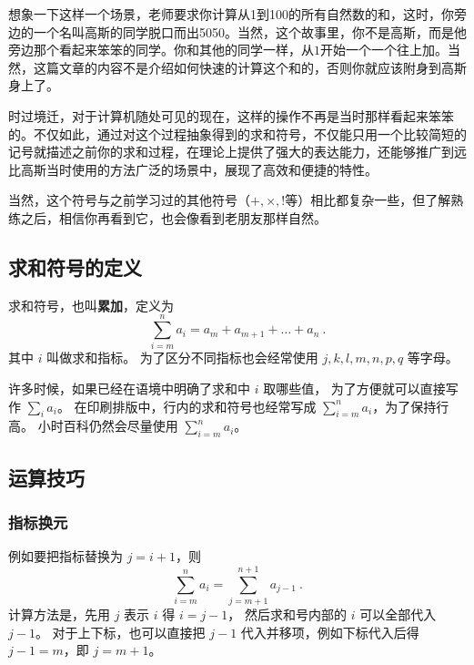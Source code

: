 
\begin{issues}
\issueDraft
\end{issues}


想象一下这样一个场景，老师要求你计算从1到100的所有自然数的和，这时，你旁边的一个名叫高斯的同学脱口而出5050。当然，这个故事里，你不是高斯，而是他旁边那个看起来笨笨的同学。你和其他的同学一样，从$1$开始一个一个往上加。当然，这篇文章的内容不是介绍如何快速的计算这个和的，否则你就应该附身到高斯身上了。

时过境迁，对于计算机随处可见的现在，这样的操作不再是当时那样看起来笨笨的。不仅如此，通过对这个过程抽象得到的求和符号，不仅能只用一个比较简短的记号就描述之前你的求和过程，在理论上提供了强大的表达能力，还能够推广到远比高斯当时使用的方法广泛的场景中，展现了高效和便捷的特性。

当然，这个符号与之前学习过的其他符号（$+,\times,!$等）相比都复杂一些，但了解熟练之后，相信你再看到它，也会像看到老朋友那样自然。

\subsection{求和符号的定义}

求和符号，也叫\textbf{累加}，定义为
\begin{equation}
\sum_{i=m}^n a_i = a_m + a_{m+1} + \dots + a_n~.
\end{equation}
其中 $i$ 叫做求和指标。 为了区分不同指标也会经常使用 $j,k,l,m,n,p,q$ 等字母。

许多时候，如果已经在语境中明确了求和中 $i$ 取哪些值， 为了方便就可以直接写作 $\sum\limits_i a_i$。 在印刷排版中，行内的求和符号也经常写成 $\sum_{i=m}^n a_i$，为了保持行高。 小时百科仍然会尽量使用 $\sum\limits_{i=m}^n a_i$。
\subsection{运算技巧}
\subsubsection{指标换元}
例如要把指标替换为 $j=i+1$，则
\begin{equation}
\sum_{i=m}^n a_i = \sum_{j=m+1}^{n+1} a_{j-1} ~.
\end{equation}
计算方法是，先用 $j$ 表示 $i$ 得 $i=j-1$， 然后求和号内部的 $i$ 可以全部代入 $j-1$。 对于上下标，也可以直接把 $j-1$ 代入并移项，例如下标代入后得 $j-1=m$，即 $j=m+1$。

